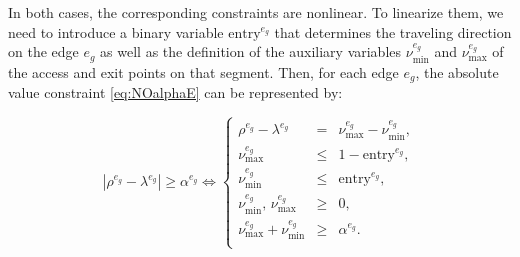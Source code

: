 \bigskip
\noindent
In both cases, the corresponding constraints are nonlinear. To linearize them, we need to introduce a binary variable $\text{entry}^{e_g}$ that determines the traveling direction on the edge $e_g$ as well as the definition of the auxiliary variables $\nu_\text{min}^{e_g}$ and $\nu_\text{max}^{e_g}$ of the access and exit points on that segment. Then, for each edge $e_g$, the absolute value constraint \eqref{eq:NOalphaE} can be represented by:


\begin{equation}\label{eq:NOalpha-E}\tag{$\alpha$-E}
 |\rho^{e_g}-\lambda^{e_g}|\geq \alpha^{e_g} \Longleftrightarrow
 \left\{
 \begin{array}{ccl}
  \rho^{e_g} - \lambda^{e_g}                       & =    & \nu_\text{max}^{e_g} - \nu_\text{min}^{e_g},                                     \\
  \nu_\text{max}^{e_g}                         & \leq & 1-{\text{entry}^{e_g}},                                   \\
  \nu_\text{min}^{e_g}                      & \leq & {  \text{entry}^{e_g}},                                        \\
    \nu_\text{min}^{e_g}, \,\nu_\text{max}^{e_g} & \geq & 0, \\

  \nu_\text{max}^{e_g} + \nu_\text{min}^{e_g} & \geq & \alpha^{e_g}.
  \\
 \end{array}
 \right.
\end{equation}

